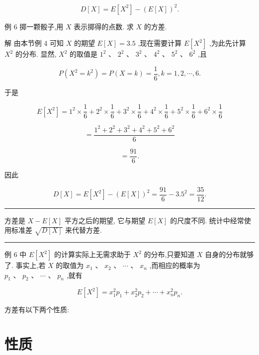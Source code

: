 \documentclass[10pt]{article}
\newcommand{\HRule}{\begin{center}\rule{0.9\linewidth}{0.2mm}\end{center}}
\begin{document}
\[
D\left\lbrack  X\right\rbrack   = E\left\lbrack  {X}^{2}\right\rbrack   - {\left( E\left\lbrack  X\right\rbrack  \right) }^{2}.
\]

例 6 掷一颗骰子,用 \(X\) 表示掷得的点数. 求 \(X\) 的方差.

解 由本节例 4 可知 \(X\) 的期望 \(E\left\lbrack  X\right\rbrack   = {3.5}\) ,现在需要计算 \(E\left\lbrack  {X}^{2}\right\rbrack\) ,为此先计算 \({X}^{2}\) 的分布. 显然, \({X}^{2}\) 的取值是 \({1}^{2}\text{ 、 }{2}^{2}\) 、 \({3}^{2}\text{ 、 }{4}^{2}\text{ 、 }{5}^{2}\text{ 、 }{6}^{2}\) ,且

\[
P\left( {{X}^{2} = {k}^{2}}\right)  = P\left( {X = k}\right)  = \frac{1}{6},k = 1,2,\cdots ,6.
\]

于是

\[
E\left\lbrack  {X}^{2}\right\rbrack   = {1}^{2} \times  \frac{1}{6} + {2}^{2} \times  \frac{1}{6} + {3}^{2} \times  \frac{1}{6} + {4}^{2} \times  \frac{1}{6} + {5}^{2} \times  \frac{1}{6} + {6}^{2} \times  \frac{1}{6}
\]

\[
= \frac{{1}^{2} + {2}^{2} + {3}^{2} + {4}^{2} + {5}^{2} + {6}^{2}}{6}
\]

\[
= \frac{91}{6}.
\]

因此



\[
D\left\lbrack  X\right\rbrack   = E\left\lbrack  {X}^{2}\right\rbrack   - {\left( E\left\lbrack  X\right\rbrack  \right) }^{2} = \frac{91}{6} - {3.5}^{2} = \frac{35}{12}.
\]

\HRule

方差是 \(X - E\left\lbrack  X\right\rbrack\) 平方之后的期望, 它与期望 \(E\left\lbrack  X\right\rbrack\) 的尺度不同. 统计中经常使用标准差 \(\sqrt{D\left\lbrack  X\right\rbrack  }\) 来代替方差.

\HRule

例 6 中 \(E\left\lbrack  {X}^{2}\right\rbrack\) 的计算实际上无需求助于 \({X}^{2}\) 的分布,只要知道 \(X\) 自身的分布就够了. 事实上,若 \(X\) 的取值为 \({x}_{1}\text{ 、 }{x}_{2}\text{ 、 }\cdots\) 、 \({x}_{n}\) ,而相应的概率为 \({p}_{1}\text{ 、 }{p}_{2}\text{ 、 }\cdots \text{ 、 }{p}_{n}\) ,就有

\[
E\left\lbrack  {X}^{2}\right\rbrack   = {x}_{1}^{2}{p}_{1} + {x}_{2}^{2}{p}_{2} + \cdots  + {x}_{n}^{2}{p}_{n}.
\]

方差有以下两个性质:

\section*{性质}
\end{document}
